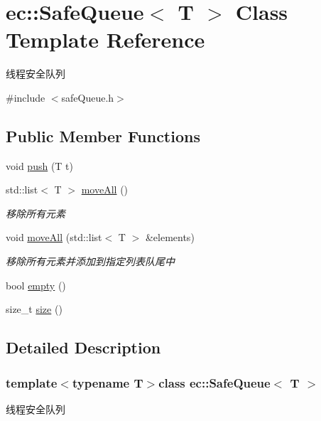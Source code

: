 \hypertarget{classec_1_1SafeQueue}{\section{ec\-:\-:Safe\-Queue$<$ T $>$ Class Template Reference}
\label{classec_1_1SafeQueue}
}


线程安全队列  




{\ttfamily \#include $<$safe\-Queue.\-h$>$}

\subsection*{Public Member Functions}
\begin{DoxyCompactItemize}
\item 
void \hyperlink{classec_1_1SafeQueue_a6382b6971ebff27efd05730cd1f7c01d}{push} (T t)
\item 
std\-::list$<$ T $>$ \hyperlink{classec_1_1SafeQueue_adf4ce61718e1f1ef816968bc11673f24}{move\-All} ()
\begin{DoxyCompactList}\small\item\em 移除所有元素 \end{DoxyCompactList}\item 
void \hyperlink{classec_1_1SafeQueue_a83fd832b0412534a2f0b040706f3942f}{move\-All} (std\-::list$<$ T $>$ \&elements)
\begin{DoxyCompactList}\small\item\em 移除所有元素并添加到指定列表队尾中 \end{DoxyCompactList}\item 
bool \hyperlink{classec_1_1SafeQueue_a227f5edd626c49cb41c9975dc0931918}{empty} ()
\item 
size\-\_\-t \hyperlink{classec_1_1SafeQueue_ab5cdb68902f04af1c5bead306accdac5}{size} ()
\end{DoxyCompactItemize}


\subsection{Detailed Description}
\subsubsection*{template$<$typename T$>$class ec\-::\-Safe\-Queue$<$ T $>$}

线程安全队列 

